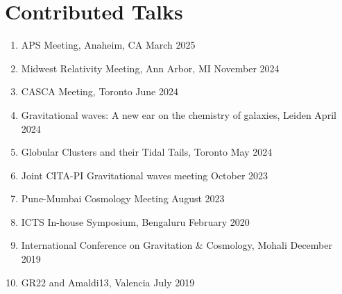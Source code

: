 	\section{Contributed Talks}
	\begin{enumerate}[leftmargin=*]
		\item APS Meeting, Anaheim, CA \hfill March 2025
		\item Midwest Relativity Meeting, Ann Arbor, MI \hfill November 2024
		\item CASCA Meeting, Toronto \hfill June 2024 
		\item {Gravitational waves: A new ear on the chemistry of galaxies}, Leiden \hfill April 2024
		\item {Globular Clusters and their Tidal Tails}, Toronto \hfill May 2024     
		\item {Joint CITA-PI Gravitational waves meeting} \hfill October 2023 
		\item Pune-Mumbai Cosmology Meeting \hfill August 2023
		\item {ICTS In-house Symposium}, Bengaluru \hfill February 2020 
		\item {International Conference on Gravitation \& Cosmology}, Mohali \hfill December 2019 
		\item {GR22 and Amaldi13}, Valencia \hfill July 2019 			
	\end{enumerate}

		

